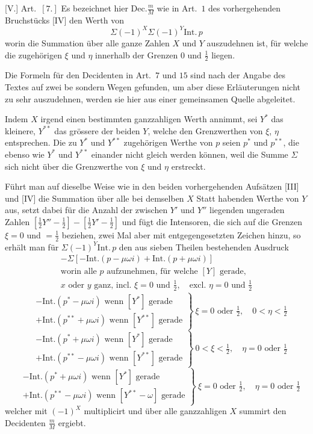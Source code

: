 [V.] Art.\ $[7.]$ Es bezeichnet hier $\mathrm{Dec.}\frac mM$ wie in Art.\ $1$ des vorhergehenden Bruchstücks [IV] den Werth von
\[
\Sigma(-1)^X\Sigma(-1)^Y\mathrm{Int.}\,p
\]
worin die Summation über alle ganze Zahlen $X$ und $Y$ auszudehnen ist, für welche die zugehörigen $\xi$ und $\eta$ innerhalb der Grenzen $0$ und $\tfrac12$ liegen.

Die Formeln für den Decidenten in Art.\ $7$ und $15$ sind nach der Angabe des Textes auf zwei be%
%
sondern Wegen gefunden, um aber diese Erläuterungen nicht zu sehr auszudehnen, werden sie hier aus einer gemeinsamen Quelle abgeleitet.

Indem $X$ irgend einen bestimmten ganzzahligen Werth annimmt, sei $Y^{*}$ das kleinere, $Y^{**}$ das grössere der beiden $Y$, welche den Grenzwerthen von $\xi$, $\eta$ entsprechen. Die zu $Y^{*}$ und $Y^{**}$ zugehörigen Werthe von $p$ seien $p^{*}$ und $p^{**}$, die ebenso wie $Y^{*}$ und $Y^{**}$ einander nicht gleich werden können, weil die Summe $\Sigma$ sich nicht über die Grenzwerthe von $\xi$ und $\eta$ erstreckt.

Führt man auf dieselbe Weise wie in den beiden vorhergehenden Aufsätzen [III] und [IV] die Summation über alle bei demselben $X$ Statt habenden Werthe von $Y$ aus, setzt dabei für die Anzahl der zwischen $Y'$ und $Y''$ liegenden ungeraden Zahlen $[\tfrac12Y''-\tfrac12]-[\tfrac12Y'-\tfrac12]$ und fügt die Intensoren, die sich auf die Grenzen $\xi=0$ und $=\tfrac12$ beziehen, zwei Mal aber mit entgegengesetzten Zeichen hinzu, so erhält man für $\Sigma(-1)^Y\mathrm{Int.}\,p$ den aus sieben Theilen bestehenden Ausdruck
\[
\begin{gathered}
-\Sigma[-\mathrm{Int.}(p-\mu\omega i)+\mathrm{Int.}(p+\mu\omega i)]\\
\text{worin alle }p\text{ aufzunehmen, für welche }[Y]\text{ gerade,}\\
x\text{ oder }y\text{ ganz, incl. }\xi=0\text{ und }\tfrac12,\quad
\text{excl. }\eta=0\text{ und }\tfrac12
\end{gathered}
\]
\[
\left.\begin{aligned}
&-\mathrm{Int.}(p^{*}-\mu\omega i)\text{ wenn }[Y^{*}]\text{ gerade}\\
&+\mathrm{Int.}(p^{**}+\mu\omega i)\text{ wenn }[Y^{**}]\text{ gerade}
\end{aligned}\right\}\ \xi=0\text{ oder }\tfrac12,\quad0<\eta<\tfrac12
\]
\[
\left.\begin{aligned}
&-\mathrm{Int.}(p^{*}+\mu\omega i)\text{ wenn }[Y^{*}]\text{ gerade}\\
&+\mathrm{Int.}(p^{**}-\mu\omega i)\text{ wenn }[Y^{**}]\text{ gerade}
\end{aligned}\right\}\ 0<\xi<\tfrac12,\quad\eta=0\text{ oder }\tfrac12
\]
\[
\left.\begin{aligned}
&-\mathrm{Int.}(p^{*}+\mu\omega i)\text{ wenn }[Y^{*}]\text{ gerade}\\
&+\mathrm{Int.}(p^{**}-\mu\omega i)\text{ wenn }[Y^{**}-\omega]\text{ gerade}
\end{aligned}\right\}\ \xi=0\text{ oder }\tfrac12,\quad\eta=0\text{ oder }\tfrac12
\]
welcher mit $(-1)^X$ multiplicirt und über alle ganzzahligen $X$ summirt den Decidenten $\frac mM$ ergiebt.

